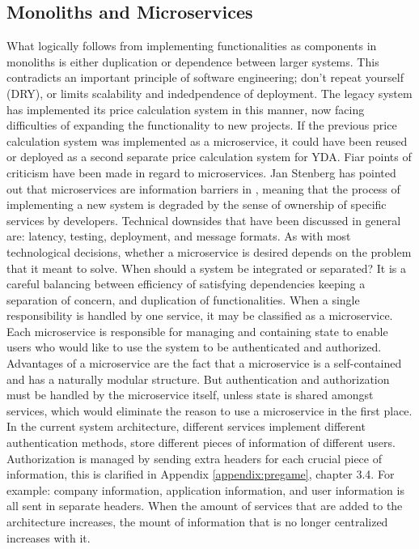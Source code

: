 \subsection{Monoliths and Microservices}
What logically follows from implementing functionalities as components in monoliths is either duplication or dependence between larger systems. This  contradicts an important principle of software engineering; don't repeat yourself (DRY), or limits scalability and indedpendence of deployment. The legacy system has implemented its price calculation system in this manner, now facing difficulties of expanding the functionality to new projects. If the previous price calculation system was implemented as a microservice, it could have been reused or deployed as a second separate price calculation system for YDA. Fiar points of criticism have been made in regard to microservices. Jan Stenberg has pointed out that microservices are information barriers in \cite{JS-microservices}, meaning that the process of implementing a new system is degraded by the sense of ownership of specific services by developers. Technical downsides that have been discussed in general are: latency, testing, deployment, and message formats. As with most technological decisions, whether a microservice is desired depends on the problem that it meant to solve. When should a system be integrated or separated? It is a careful balancing between efficiency of satisfying dependencies keeping a separation of concern, and duplication of functionalities. When a single responsibility is handled by one service, it may be classified as a microservice. Each microservice is responsible for managing and containing state to enable users who would like to use the system to be authenticated and authorized. Advantages of a microservice are the fact that a microservice is a self-contained and has a naturally modular structure. But authentication and authorization must be handled by the microservice itself, unless state is shared amongst services, which would eliminate the reason to use a microservice in the first place. In the current system architecture, different services implement different authentication methods, store different pieces of information of different users. Authorization is managed by sending extra headers for each crucial piece of information, this is clarified in Appendix \ref{appendix:pregame}, chapter 3.4. For example: company information, application information, and user information is all sent in separate headers. When the amount of services that are added to the architecture increases, the mount of information that is no longer centralized increases with it.

